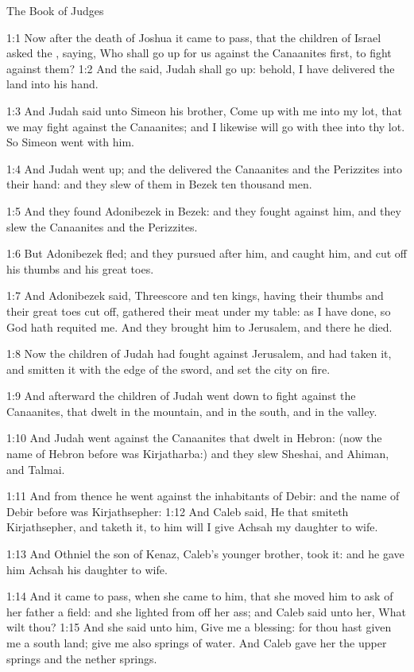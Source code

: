 The Book of Judges


1:1 Now after the death of Joshua it came to pass, that the children of Israel asked the \LORD, saying, Who shall go up for us against the Canaanites first, to fight against them?  1:2 And the \LORD said, Judah shall go up: behold, I have delivered the land into his hand.

1:3 And Judah said unto Simeon his brother, Come up with me into my lot, that we may fight against the Canaanites; and I likewise will go with thee into thy lot. So Simeon went with him.

1:4 And Judah went up; and the \LORD delivered the Canaanites and the Perizzites into their hand: and they slew of them in Bezek ten thousand men.

1:5 And they found Adonibezek in Bezek: and they fought against him, and they slew the Canaanites and the Perizzites.

1:6 But Adonibezek fled; and they pursued after him, and caught him, and cut off his thumbs and his great toes.

1:7 And Adonibezek said, Threescore and ten kings, having their thumbs and their great toes cut off, gathered their meat under my table: as I have done, so God hath requited me. And they brought him to Jerusalem, and there he died.

1:8 Now the children of Judah had fought against Jerusalem, and had taken it, and smitten it with the edge of the sword, and set the city on fire.

1:9 And afterward the children of Judah went down to fight against the Canaanites, that dwelt in the mountain, and in the south, and in the valley.

1:10 And Judah went against the Canaanites that dwelt in Hebron: (now the name of Hebron before was Kirjatharba:) and they slew Sheshai, and Ahiman, and Talmai.

1:11 And from thence he went against the inhabitants of Debir: and the name of Debir before was Kirjathsepher: 1:12 And Caleb said, He that smiteth Kirjathsepher, and taketh it, to him will I give Achsah my daughter to wife.

1:13 And Othniel the son of Kenaz, Caleb's younger brother, took it: and he gave him Achsah his daughter to wife.

1:14 And it came to pass, when she came to him, that she moved him to ask of her father a field: and she lighted from off her ass; and Caleb said unto her, What wilt thou?  1:15 And she said unto him, Give me a blessing: for thou hast given me a south land; give me also springs of water. And Caleb gave her the upper springs and the nether springs.

